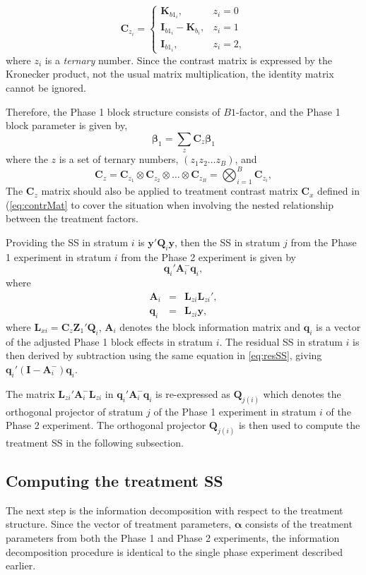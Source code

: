 \documentclass[article]{jss}
\newcommand{\I}{\mathbf{I}}
\newcommand{\K}{\mathbf{K}}
\newcommand{\Z}{\mathbf{Z}}
\newcommand{\Q}{\mathbf{Q}}
\newcommand{\A}{\mathbf{A}}
\newcommand{\C}{\mathbf{C}}
\newcommand{\mL}{\mathbf{L}}
\begin{document}
\begin{equation}
\label{eq:contrMat1}
\C_{z_i} =
   \begin{cases}
       \K_{b1_i}, & z_i = 0 \\
       \I_{b1_i} - \K_{b_i}, & z_i = 1\\
        \I_{b1_i}, & z_i = 2,
    \end{cases}
\end{equation}
where $z_i$ is a \emph{ternary} number. Since the contrast matrix is expressed by the Kronecker product, not the usual matrix multiplication, the identity matrix cannot be ignored. 

Therefore, the Phase 1 block structure consists of $B1$-factor, and the Phase 1 block parameter is given by, 
\begin{equation}
\bm{\beta}_1 = \sum_z{\C_z\bm{\beta}_1}
\end{equation}
where the $z$ is a set of ternary numbers, $(z_1 z_2 \dots z_{B})$, and 
\[
\C_z =  \C_{z_1} \otimes  \C_{z_2} \otimes \dots \otimes  \C_{z_{B}} = \bigotimes^{B} _{i = 1} \C_{z_i},
\]
The $\C_{z}$ matrix should also be applied to treatment contrast matrix $\C_{x}$ defined in (\ref{eq:contrMat} to cover the situation when involving the nested relationship between the treatment factors. 

Providing the SS in stratum $i$ is $\bm{y}' \Q_i\bm{y}$, then the SS in stratum $j$ from the Phase 1 experiment in stratum $i$ from the Phase 2 experiment is given by 
\[
 \bm{q}_{i}' \A_{i}^{-} \bm{q}_{i},
\]
where
\begin{eqnarray*}
\A_i &=& \mL_{zi}\mL_{zi}',\\
\bm{q}_i &=& \mL_{zi} \bm{y},
\end{eqnarray*}
where $\mL_{xi} = \C_z \Z_1' \Q_i$, $\A_i$ denotes the block information matrix and $\bm{q}_i$ is a vector of the adjusted Phase 1 block effects in stratum $i$. The residual SS in stratum $i$ is then derived by subtraction using the same equation in \ref{eq:resSS}, giving $\bm{q}_{i}'(\I- \A_{i}^{-}) \bm{q}_{i}$.

The matrix $\mL_{zi}' \A_{i}^{-}\mL_{zi}$ in $\bm{q}_{i}' \A_{i}^{-} \bm{q}_{i}$ is re-expressed as $\Q_{j(i)}$ which denotes the orthogonal projector of stratum $j$ of the Phase 1 experiment in stratum $i$ of the Phase 2 experiment. The orthogonal projector $\Q_{j(i)}$ is then used to compute the treatment SS in the following subsection.

\subsection{Computing the treatment SS}
\label{subsec:trtDecomp}
The next step is the information decomposition with respect to the treatment structure. Since the vector of treatment parameters, $\bm{\alpha}$ consists of the treatment parameters from both the Phase 1 and Phase 2 experiments, the information decomposition procedure is identical to the single phase experiment described earlier. 
\end{document}
